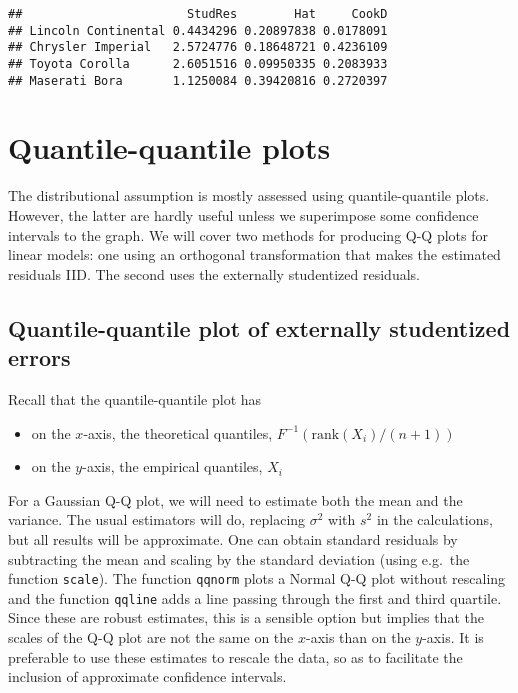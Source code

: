 \documentclass[]{book}
\providecommand{\tightlist}{%
  \setlength{\itemsep}{0pt}\setlength{\parskip}{0pt}}
\theoremstyle{definition}
\theoremstyle{definition}
\theoremstyle{definition}
\theoremstyle{remark}
\begin{document}
\begin{verbatim}
##                       StudRes        Hat     CookD
## Lincoln Continental 0.4434296 0.20897838 0.0178091
## Chrysler Imperial   2.5724776 0.18648721 0.4236109
## Toyota Corolla      2.6051516 0.09950335 0.2083933
## Maserati Bora       1.1250084 0.39420816 0.2720397
\end{verbatim}

\hypertarget{qqplot}{%
\section{Quantile-quantile plots}\label{qqplot}}

The distributional assumption is mostly assessed using quantile-quantile
plots. However, the latter are hardly useful unless we superimpose some
confidence intervals to the graph. We will cover two methods for
producing Q-Q plots for linear models: one using an orthogonal
transformation that makes the estimated residuals IID. The second uses
the externally studentized residuals.

\hypertarget{quantile-quantile-plot-of-externally-studentized-errors}{%
\subsection{Quantile-quantile plot of externally studentized
errors}\label{quantile-quantile-plot-of-externally-studentized-errors}}

Recall that the quantile-quantile plot has

\begin{itemize}
\tightlist
\item
  on the \(x\)-axis, the theoretical quantiles,
  \(F^{-1}(\mathrm{rank}(X_i)/(n+1))\)
\item
  on the \(y\)-axis, the empirical quantiles, \(X_i\)
\end{itemize}

For a Gaussian Q-Q plot, we will need to estimate both the mean and the
variance. The usual estimators will do, replacing \(\sigma^2\) with
\(s^2\) in the calculations, but all results will be approximate. One
can obtain standard residuals by subtracting the mean and scaling by the
standard deviation (using e.g.~the function \texttt{scale}). The
function \texttt{qqnorm} plots a Normal Q-Q plot without rescaling and
the function \texttt{qqline} adds a line passing through the first and
third quartile. Since these are robust estimates, this is a sensible
option but implies that the scales of the Q-Q plot are not the same on
the \(x\)-axis than on the \(y\)-axis. It is preferable to use these
estimates to rescale the data, so as to facilitate the inclusion of
approximate confidence intervals.
\end{document}
